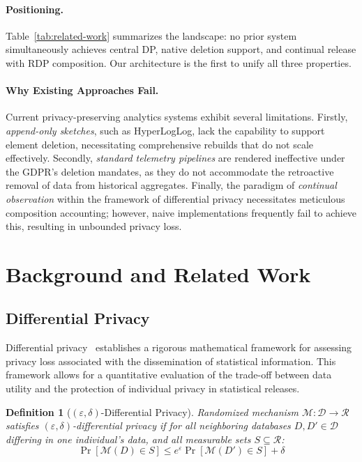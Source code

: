 \documentclass[sigconf,anonymous,review]{acmart}
\newtheorem{definition}[theorem]{Definition}
\begin{document}
\paragraph{Positioning.} Table~\ref{tab:related-work} summarizes the landscape: no prior system simultaneously achieves central DP, native deletion support, and continual release with RDP composition. Our architecture is the first to unify all three properties.

\paragraph{Why Existing Approaches Fail.} Current privacy-preserving analytics systems exhibit several limitations. Firstly, \emph{append-only sketches}, such as HyperLogLog, lack the capability to support element deletion, necessitating comprehensive rebuilds that do not scale effectively. Secondly, \emph{standard telemetry pipelines} are rendered ineffective under the GDPR's deletion mandates, as they do not accommodate the retroactive removal of data from historical aggregates. Finally, the paradigm of \emph{continual observation} within the framework of differential privacy necessitates meticulous composition accounting; however, naive implementations frequently fail to achieve this, resulting in unbounded privacy loss.

\section{Background and Related Work}

\subsection{Differential Privacy}

Differential privacy~\cite{Dwork2006, Dwork2014} establishes a rigorous mathematical framework for assessing privacy loss associated with the dissemination of statistical information. This framework allows for a quantitative evaluation of the trade-off between data utility and the protection of individual privacy in statistical releases.

\begin{definition}[$(\varepsilon, \delta)$-Differential Privacy] Randomized mechanism $\mathcal{M}: \mathcal{D} \to \mathcal{R}$ satisfies $(\varepsilon, \delta)$-differential privacy if for all neighboring databases $D, D' \in \mathcal{D}$ differing in one individual's data, and all measurable sets $S \subseteq \mathcal{R}$:
    \[
        \Pr[\mathcal{M}(D) \in S] \leq e^\varepsilon \Pr[\mathcal{M}(D') \in S] + \delta
    \]
\end{definition}
\end{document}
